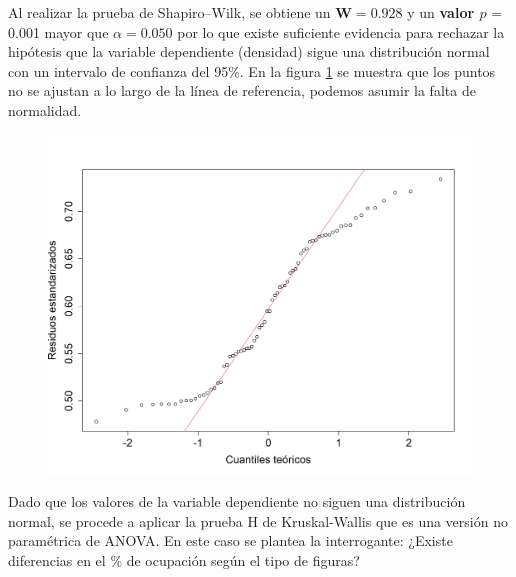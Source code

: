 \documentclass[5p,times]{elsarticle}
\begin{document}
Al realizar la prueba de Shapiro--Wilk, se obtiene un $\textbf{W}=0.928$ y un \textbf{valor $p$} = 0.001 mayor que $\alpha = 0.050$ por lo que existe suficiente evidencia para rechazar la hipótesis que la variable dependiente (densidad) sigue una distribución normal con un intervalo de confianza del 95\%. En la figura \ref{fig:normal2} se muestra que los puntos no se ajustan a lo largo de la línea de referencia, podemos asumir la falta de normalidad.
	\begin{figure}
				\begin{center}
					\includegraphics[scale=0.35]{figuras/circularnormal.png}
					\label{fig:normal2}
				\end{center}
			\end{figure} 

Dado que los valores de la variable dependiente no siguen una distribución normal, se procede a aplicar la prueba H de Kruskal-Wallis que es una versión no paramétrica de ANOVA. En este caso se plantea la interrogante: ¿Existe diferencias en el \% de ocupación según el tipo de figuras?
\end{document}
